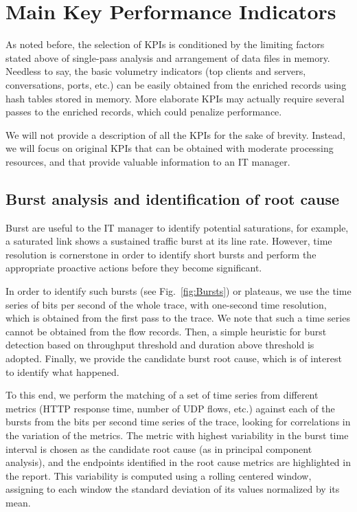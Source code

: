 \documentclass[AMA,STIX1COL]{WileyNJD-v2}
\begin{document}
\section{Main Key Performance Indicators}

As noted before, the selection of KPIs is conditioned by the limiting factors stated above of single-pass analysis and arrangement of data files in memory. Needless to say, the basic volumetry indicators (top clients and servers, conversations, ports, etc.) can be easily obtained from the enriched records using hash tables stored in memory. More elaborate KPIs may actually require several passes to the enriched records, which could penalize performance.

We will not provide a description of all the KPIs for the sake of brevity. Instead, we will focus on original KPIs that can be obtained with moderate processing resources, and that provide valuable information to an IT manager.

\subsection{Burst analysis and identification of root cause}

Burst are useful to the IT manager to identify potential saturations, for example, a saturated link shows a sustained traffic burst at its line rate. However, time resolution is cornerstone in order to identify short bursts and perform the appropriate proactive actions before they become significant.  %

In order to identify such bursts (see Fig.~\ref{fig:Bursts}) or plateaus, we use the time series of bits per second of the whole trace, with one-second time resolution, which is obtained from the first pass to the trace. We note that such a time series cannot be obtained from the flow records. Then, a simple heuristic for burst detection based on throughput threshold and duration above threshold is adopted. Finally, we provide the candidate burst root cause, which is of interest to identify what happened.

To this end, we perform the matching of a set of time series from different metrics (HTTP response time, number of UDP flows, etc.) against each of the bursts from the bits per second time series of the trace, looking for correlations in the variation of the metrics. The metric with highest variability in the burst time interval is chosen as the candidate root cause (as in principal component analysis), and the endpoints identified in the root cause metrics are highlighted in the report. This variability is computed using a rolling centered window, assigning to each window the standard deviation of its values normalized by its mean.
\end{document}

